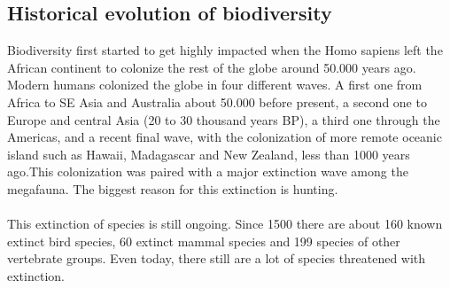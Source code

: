 \documentclass[../summary.tex]{subfiles}
\begin{document}
	\subsection{Historical evolution of biodiversity}
	Biodiversity first started to get highly impacted when the Homo sapiens left the African continent to colonize the rest of the globe around 50.000 years ago. Modern humans colonized the globe in four different waves. A first one from Africa to SE Asia and Australia about 50.000 before present, a second one to Europe and central Asia (20 to 30 thousand years BP), a third one through the Americas, and a recent final wave, with the colonization of more remote oceanic island such as Hawaii, Madagascar and New Zealand, less than 1000 years ago.This colonization was paired with a major extinction wave among the megafauna. The biggest reason for this extinction is hunting. 
	\\
	\\
	This extinction of species is still ongoing. Since 1500 there are about 160 known extinct bird species, 60 extinct mammal species and 199 species of other vertebrate groups. Even today, there still are a lot of species threatened with extinction. 
	
\end{document}

